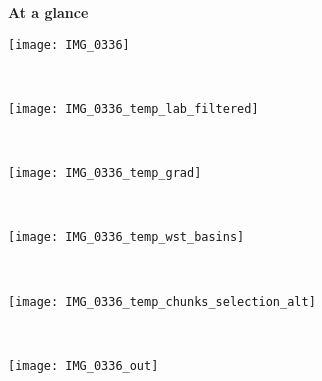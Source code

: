   
  \vspace*{-0.2em}

  \begin{exampleblock}{\bf At a glance}
    \centering

    \vspace*{.1em}

  \begin{minipage}{.154\linewidth}
    \texttt{[image: IMG\_0336]}
    \label{fig:glob.input}
  \end{minipage}
  ~
  \begin{minipage}{.154\linewidth}
    \texttt{[image: IMG\_0336\_temp\_lab\_filtered]}
    \label{fig:glob.labfiltered}
  \end{minipage}
  ~
  \begin{minipage}{.154\linewidth}
    \texttt{[image: IMG\_0336\_temp\_grad]}
    \label{fig:glob.gradient}
  \end{minipage}
  ~
   \begin{minipage}{.154\linewidth}
    \texttt{[image: IMG\_0336\_temp\_wst\_basins]}
    \label{fig:glob.basins}
  \end{minipage}
  ~
   \begin{minipage}{.154\linewidth}
    \texttt{[image: IMG\_0336\_temp\_chunks\_selection\_alt]}
    \label{fig:glob.chunks}
  \end{minipage}
  ~
   \begin{minipage}{.154\linewidth}
    \texttt{[image: IMG\_0336\_out]}
    \label{fig:glob.decision}
  \end{minipage}


\end{exampleblock}
